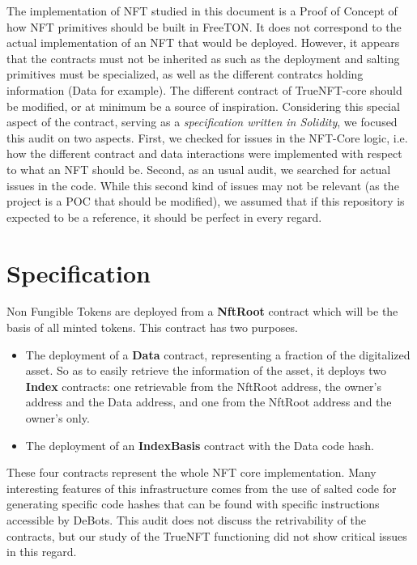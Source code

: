 
The implementation of NFT studied in this document is a Proof of Concept
of how NFT primitives should be built in FreeTON.
%
It does not correspond to the actual implementation of an NFT that would
be deployed.
%
However, it appears that the contracts must not be inherited as such as
the deployment and salting primitives must be specialized, as well as
the different contratcs holding information (Data for example).
%
The different contract of TrueNFT-core should be modified, or at minimum 
be a source of inspiration.
%
Considering this special aspect of the contract, serving as a 
\emph{specification written in Solidity}, we focused this audit on two 
aspects.
%
First, we checked for issues in the NFT-Core logic, i.e. how the different
contract and data interactions were implemented with respect to what an NFT
should be.
%
Second, as an usual audit, we searched for actual issues in the code.
%
While this second kind of issues may not be relevant (as the project is a 
POC that should be modified), we assumed that if this repository is expected
to be a reference, it should be perfect in every regard. 

\section{Specification}

Non Fungible Tokens are deployed from a \textbf{NftRoot} contract which will
be the basis of all minted tokens.
%
This contract has two purposes.
\begin{itemize}
    \item The deployment of a \textbf{Data} contract, representing a fraction of the
    digitalized asset. So as to easily retrieve the information of the asset, 
    it deploys two \textbf{Index} contracts: one retrievable from the NftRoot address,
    the owner's address and the Data address, and one from the NftRoot address
    and the owner's only. 
    \item The deployment of an \textbf{IndexBasis} contract with the Data code hash.
\end{itemize}

These four contracts represent the whole NFT core implementation.
%
Many interesting features of this infrastructure comes from the use of salted code
for generating specific code hashes that can be found with specific instructions accessible 
by DeBots.
%
This audit does not discuss the retrivability of the contracts, but our study of the TrueNFT 
functioning did not show critical issues in this regard.

